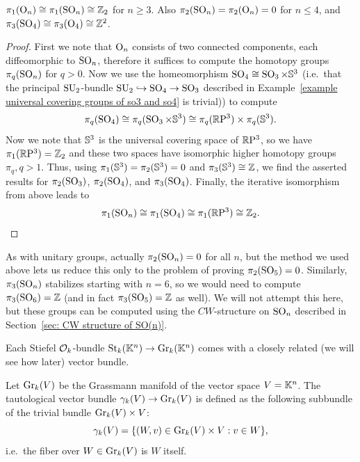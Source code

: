 \begin{cor}
    $\pi_1(\operatorname{O}_n)\cong \pi_1(\operatorname{SO}_n)\cong\mathbb{Z}_2$ for $n\geq 3$. Also $\pi_2(\operatorname{SO}_n)=\pi_2(\operatorname{O}_n)=0$ for $n\leq 4$, and $\pi_3(\operatorname{SO}_4)\cong\pi_3(\operatorname{O}_4)\cong\mathbb{Z}^2$.
\end{cor}
\begin{proof}
    First we note that $\operatorname{O}_n$ consists of two connected components, each diffeomorphic to $\operatorname{SO}_n$, therefore it suffices to compute the homotopy groups $\pi_q(\operatorname{SO}_n)$ for $q>0$. Now we use the homeomorphism $\operatorname{SO}_4\cong\operatorname{SO}_3\times \mathbb{S}^3$ (i.e.\ that the principal $\operatorname{SU}_2$-bundle $\operatorname{SU}_2\hookrightarrow \operatorname{SO}_4\to \operatorname{SO}_3$ described in Example~\ref{example universal covering groups of so3 and so4} is trivial)) to compute
    \[\pi_q(\operatorname{SO}_4)\cong \pi_q(\operatorname{SO}_3\times \mathbb{S}^3)\cong \pi_q(\mathbb{R}\mathrm{P}^3)\times \pi_q(\mathbb{S}^3).\]
    Now we note that $\mathbb{S}^3$ is the universal covering space of $\mathbb{R}\mathrm{P}^3$, so we have $\pi_1(\mathbb{R}\mathrm{P}^3)=\mathbb{Z}_2$ and these two spaces have isomorphic higher homotopy groups $\pi_q, q>1$. Thus, using $\pi_1(\mathbb{S}^3)=\pi_2(\mathbb{S}^3)=0$ and $\pi_3(\mathbb{S}^3)\cong \mathbb{Z}$, we find the asserted results for $\pi_2(\operatorname{SO}_3)$, $\pi_2(\operatorname{SO}_4)$, and $\pi_3(\operatorname{SO}_4)$. Finally, the iterative isomorphism from above leads to
    \[
        \pi_1(\operatorname{SO}_n)\cong \pi_1(\operatorname{SO}_4)\cong \pi_1(\mathbb{R}\mathrm{P}^3)\cong \mathbb{Z}_2.
    \]
\end{proof}
\begin{rem}
    As with unitary groups, actually $\pi_2(\operatorname{SO}_n)=0$ for all $n$, but the method we used above lets us reduce this only to the problem of proving $\pi_2(\operatorname{SO}_5)=0$. Similarly, $\pi_3(\operatorname{SO}_n)$ stabilizes starting with $n=6$, so we would need to compute $\pi_3(\operatorname{SO}_6)=\mathbb{Z}$ (and in fact $\pi_3(\operatorname{SO}_5)=\mathbb{Z}$ as well). We will not attempt this here, but these groups can be computed using the $CW$-structure on $\operatorname{SO}_n$ described in Section~\ref{sec: CW structure of SO(n)}.
\end{rem}


Each Stiefel $\mathcal{O}_k$-bundle $\operatorname{St}_k(\mathbb{K}^n)\to \operatorname{Gr}_k(\mathbb{K}^n)$ comes with a closely related (we will see how later) vector bundle.

\begin{defn}
    Let $\operatorname{Gr}_k(V)$ be the Grassmann manifold of the vector space $V=\mathbb{K}^n$. The tautological vector bundle $\gamma_k(V)\to \operatorname{Gr}_k(V)$ is defined as the following subbundle of the trivial bundle $\operatorname{Gr}_k(V)\times V$:
    \[\gamma_k(V)=\{(W,v)\in \operatorname{Gr}_k(V)\times V: v\in W\},\]
    i.e.~the fiber over $W\in \operatorname{Gr}_k(V)$ is $W$ itself.
\end{defn}

